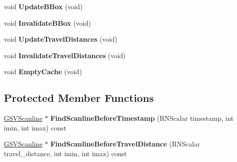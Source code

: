 \begin{DoxyCompactItemize}
\item 
void {\bfseries Update\+B\+Box} (void)\hypertarget{class_g_s_v_scan_a139cb5cfc9378fa83a2bf39720bdb124}{}\label{class_g_s_v_scan_a139cb5cfc9378fa83a2bf39720bdb124}

\item 
void {\bfseries Invalidate\+B\+Box} (void)\hypertarget{class_g_s_v_scan_a8d1f61bc9ce96f28678c780541b1b7cf}{}\label{class_g_s_v_scan_a8d1f61bc9ce96f28678c780541b1b7cf}

\item 
void {\bfseries Update\+Travel\+Distances} (void)\hypertarget{class_g_s_v_scan_a3a7a4ae54f4d51609ef023ebf8783994}{}\label{class_g_s_v_scan_a3a7a4ae54f4d51609ef023ebf8783994}

\item 
void {\bfseries Invalidate\+Travel\+Distances} (void)\hypertarget{class_g_s_v_scan_ace6d56d0b4baf4f13801454badcc5616}{}\label{class_g_s_v_scan_ace6d56d0b4baf4f13801454badcc5616}

\item 
void {\bfseries Empty\+Cache} (void)\hypertarget{class_g_s_v_scan_a1654c8c1c5457a88a4ea6decd0f5c44a}{}\label{class_g_s_v_scan_a1654c8c1c5457a88a4ea6decd0f5c44a}

\end{DoxyCompactItemize}
\subsection*{Protected Member Functions}
\begin{DoxyCompactItemize}
\item 
\hyperlink{class_g_s_v_scanline}{G\+S\+V\+Scanline} $\ast$ {\bfseries Find\+Scanline\+Before\+Timestamp} (R\+N\+Scalar timestamp, int imin, int imax) const \hypertarget{class_g_s_v_scan_a40639c8a2e71480fb114dbff2077875b}{}\label{class_g_s_v_scan_a40639c8a2e71480fb114dbff2077875b}

\item 
\hyperlink{class_g_s_v_scanline}{G\+S\+V\+Scanline} $\ast$ {\bfseries Find\+Scanline\+Before\+Travel\+Distance} (R\+N\+Scalar travel\+\_\+distance, int imin, int imax) const \hypertarget{class_g_s_v_scan_a7f2ed84a9131e787262a17341b574fcf}{}\label{class_g_s_v_scan_a7f2ed84a9131e787262a17341b574fcf}

\end{DoxyCompactItemize}
